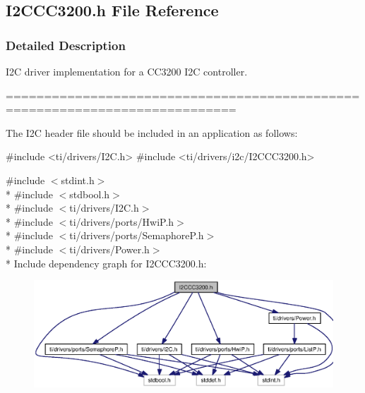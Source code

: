 \subsection{I2\+C\+C\+C3200.\+h File Reference}
\label{_i2_c_c_c3200_8h}


\subsubsection{Detailed Description}
I2\+C driver implementation for a C\+C3200 I2\+C controller. 

============================================================================

The I2\+C header file should be included in an application as follows\+: 
\begin{DoxyCode}
\textcolor{preprocessor}{#include <ti/drivers/I2C.h>}
\textcolor{preprocessor}{#include <ti/drivers/i2c/I2CCC3200.h>}
\end{DoxyCode}
 

{\ttfamily \#include $<$stdint.\+h$>$}\\*
{\ttfamily \#include $<$stdbool.\+h$>$}\\*
{\ttfamily \#include $<$ti/drivers/\+I2\+C.\+h$>$}\\*
{\ttfamily \#include $<$ti/drivers/ports/\+Hwi\+P.\+h$>$}\\*
{\ttfamily \#include $<$ti/drivers/ports/\+Semaphore\+P.\+h$>$}\\*
{\ttfamily \#include $<$ti/drivers/\+Power.\+h$>$}\\*
Include dependency graph for I2\+C\+C\+C3200.\+h\+:
\nopagebreak
\begin{figure}[H]
\begin{center}
\leavevmode
\includegraphics[width=350pt]{_i2_c_c_c3200_8h__incl}
\end{center}
\end{figure}
